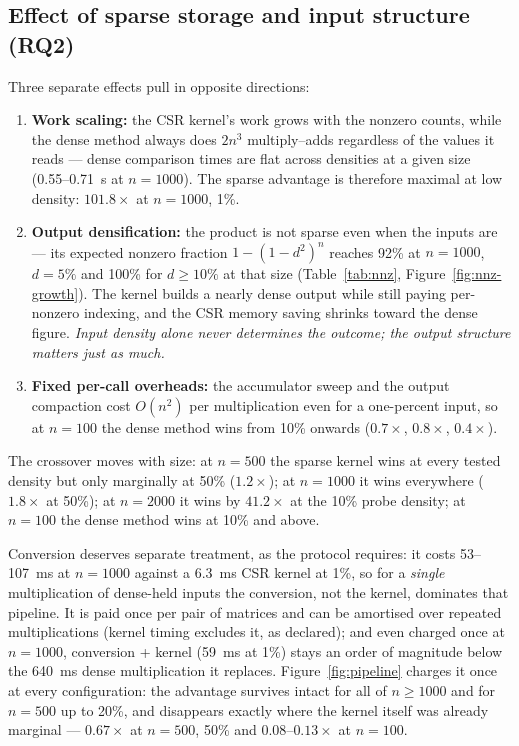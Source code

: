 \documentclass[11pt,a4paper]{article}
\begin{document}
\subsection{Effect of sparse storage and input structure (RQ2)}

Three separate effects pull in opposite directions:
\begin{enumerate}
    \item \textbf{Work scaling:} the CSR kernel's work grows with the
    nonzero counts, while the dense method always does $2n^3$ multiply--adds
    regardless of the values it reads --- dense comparison times are flat
    across densities at a given size (0.55--0.71~s at $n = 1000$). The sparse
    advantage is therefore maximal at low density: $101.8\times$ at
    $n = 1000$, 1\%.
    \item \textbf{Output densification:} the product is not sparse even when
    the inputs are --- its expected nonzero fraction $1 - (1 - d^2)^n$ reaches
    92\% at $n = 1000$, $d = 5\%$ and 100\% for $d \ge 10\%$ at that size
    (Table~\ref{tab:nnz}, Figure~\ref{fig:nnz-growth}). The kernel builds a
    nearly dense output while still paying per-nonzero indexing, and the CSR
    memory saving shrinks toward the dense figure. \emph{Input density alone
    never determines the outcome; the output structure matters just as
    much.}
    \item \textbf{Fixed per-call overheads:} the accumulator sweep and the
    output compaction cost $O(n^2)$ per multiplication even for a one-percent
    input, so at $n = 100$ the dense method wins from 10\% onwards
    ($0.7\times$, $0.8\times$, $0.4\times$).
\end{enumerate}
The crossover moves with size: at $n = 500$ the sparse kernel wins at every
tested density but only marginally at 50\% ($1.2\times$); at $n = 1000$ it
wins everywhere ($1.8\times$ at 50\%); at $n = 2000$ it wins by
$41.2\times$ at the 10\% probe density; at $n = 100$ the dense method wins
at 10\% and above.

Conversion deserves separate treatment, as the protocol requires: it costs
53--107~ms at $n = 1000$ against a 6.3~ms CSR kernel at 1\%, so for a
\emph{single} multiplication of dense-held inputs the conversion, not the
kernel, dominates that pipeline. It is paid once per pair of matrices and
can be amortised over repeated multiplications (kernel timing excludes it,
as declared); and even charged once at $n = 1000$, conversion + kernel
(59~ms at 1\%) stays an order of magnitude below the 640~ms dense
multiplication it replaces. Figure~\ref{fig:pipeline} charges it once at
every configuration: the advantage survives intact for all of $n \ge 1000$
and for $n = 500$ up to 20\%, and disappears exactly where the kernel itself
was already marginal --- $0.67\times$ at $n = 500$, 50\% and
$0.08$--$0.13\times$ at $n = 100$.
\end{document}
